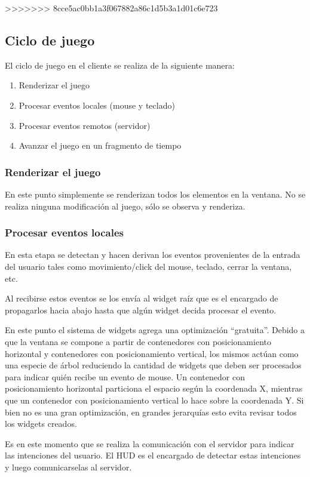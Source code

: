 \documentclass[titlepage,a4paper,12pt]{article}
\begin{document}
>>>>>>> 8cce5ac0bb1a3f067882a86c1d5b3a1d01c6e723
\subsection{Ciclo de juego}
El ciclo de juego en el cliente se realiza de la siguiente manera:
\begin{enumerate}
    \item Renderizar el juego
    \item Procesar eventos locales (mouse y teclado)
    \item Procesar eventos remotos (servidor)
    \item Avanzar el juego en un fragmento de tiempo
\end{enumerate}

\subsubsection{Renderizar el juego}
En este punto simplemente se renderizan todos los elementos en la ventana. No se realiza ninguna modificación al juego, sólo se observa y renderiza.

\subsubsection{Procesar eventos locales}
En esta etapa se detectan y hacen derivan los eventos provenientes de la entrada del usuario tales como movimiento/click del mouse, teclado, cerrar la ventana, etc.

Al recibirse estos eventos se los envía al widget raíz que es el encargado de propagarlos hacia abajo hasta que algún widget decida procesar el evento.

En este punto el sistema de widgets agrega una optimización ``gratuita''. Debido a que la ventana se compone a partir de contenedores con posicionamiento horizontal y contenedores con posicionamiento vertical, los mismos actúan como una especie de árbol reduciendo la cantidad de widgets que deben ser procesados para indicar quién recibe un evento de mouse. 
Un contenedor con posicionamiento horizontal particiona el espacio según la coordenada X, mientras que un contenedor con posicionamiento vertical lo hace sobre la coordenada Y. Si bien no es una gran optimización, en grandes jerarquías esto evita revisar todos los widgets creados.

Es en este momento que se realiza la comunicación con el servidor para indicar las intenciones del usuario. El HUD es el encargado de detectar estas intenciones y luego comunicarselas al servidor.
\end{document}
